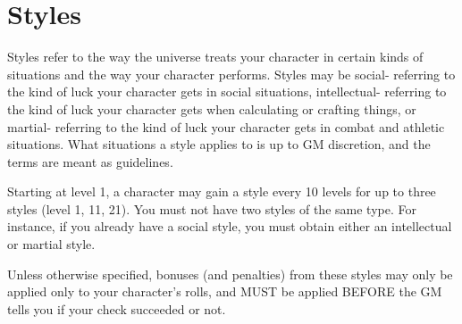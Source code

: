 \section{Styles}
Styles refer to the way the universe treats your character in certain kinds of situations and the way your character performs. Styles may be social- referring to the kind of luck your character gets in social situations, intellectual- referring to the kind of luck your character gets when calculating or crafting things, or martial- referring to the kind of luck your character gets in combat and athletic situations. What situations a style applies to is up to GM discretion, and the terms are meant as guidelines.

Starting at level 1, a character may gain a style every 10 levels for up to three styles (level 1, 11, 21). You must not have two styles of the same type. For instance, if you already have a social style, you must obtain either an intellectual or martial style.

Unless otherwise specified, bonuses (and penalties) from these styles may only be applied only to your character's rolls, and MUST be applied BEFORE the GM tells you if your check succeeded or not.

